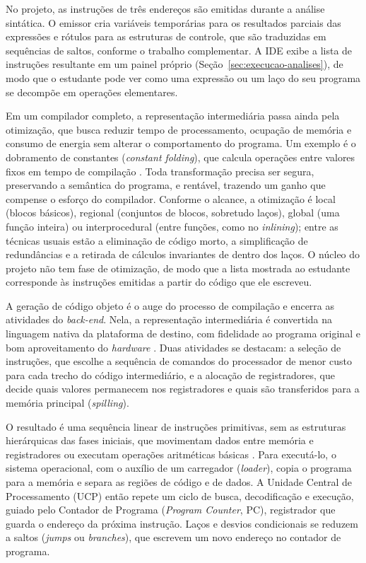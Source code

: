 No projeto, as instruções de três endereços são emitidas durante a análise sintática. O emissor cria variáveis temporárias para os resultados parciais das expressões e rótulos para as estruturas de controle, que são traduzidas em sequências de saltos, conforme o trabalho complementar. A IDE exibe a lista de instruções resultante em um painel próprio (Seção~\ref{sec:execucao-analises}), de modo que o estudante pode ver como uma expressão ou um laço do seu programa se decompõe em operações elementares.

Em um compilador completo, a representação intermediária passa ainda pela otimização, que busca reduzir tempo de processamento, ocupação de memória e consumo de energia sem alterar o comportamento do programa. Um exemplo é o dobramento de constantes (\textit{constant folding}), que calcula operações entre valores fixos em tempo de compilação \cite{aho1995,cooper2012}. Toda transformação precisa ser segura, preservando a semântica do programa, e rentável, trazendo um ganho que compense o esforço do compilador. Conforme o alcance, a otimização é local (blocos básicos), regional (conjuntos de blocos, sobretudo laços), global (uma função inteira) ou interprocedural (entre funções, como no \textit{inlining}); entre as técnicas usuais estão a eliminação de código morto, a simplificação de redundâncias e a retirada de cálculos invariantes de dentro dos laços. O núcleo do projeto não tem fase de otimização, de modo que a lista mostrada ao estudante corresponde às instruções emitidas a partir do código que ele escreveu.

A geração de código objeto é o auge do processo de compilação e encerra as atividades do \textit{back-end}. Nela, a representação intermediária é convertida na linguagem nativa da plataforma de destino, com fidelidade ao programa original e bom aproveitamento do \textit{hardware} \cite{aho1995,cooper2012,appel2002}. Duas atividades se destacam: a seleção de instruções, que escolhe a sequência de comandos do processador de menor custo para cada trecho do código intermediário, e a alocação de registradores, que decide quais valores permanecem nos registradores e quais são transferidos para a memória principal (\textit{spilling}).

O resultado é uma sequência linear de instruções primitivas, sem as estruturas hierárquicas das fases iniciais, que movimentam dados entre memória e registradores ou executam operações aritméticas básicas \cite{cooper2012,nystrom2021}. Para executá-lo, o sistema operacional, com o auxílio de um carregador (\textit{loader}), copia o programa para a memória e separa as regiões de código e de dados. A Unidade Central de Processamento (UCP) então repete um ciclo de busca, decodificação e execução, guiado pelo Contador de Programa (\textit{Program Counter}, PC), registrador que guarda o endereço da próxima instrução. Laços e desvios condicionais se reduzem a saltos (\textit{jumps} ou \textit{branches}), que escrevem um novo endereço no contador de programa.

